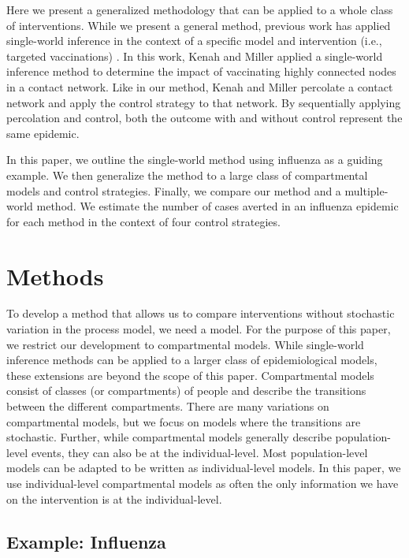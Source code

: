 \documentclass[openacc]{rsproca_new}%
\begin{document}
Here we present a generalized methodology that can be applied to a whole class of interventions.
While we present a general method, previous work has applied single-world inference in the context of a specific model and intervention (i.e., targeted vaccinations) \cite{kenah-miller:2011}.
In this work, Kenah and Miller applied a single-world inference method to determine the impact of vaccinating highly connected nodes in a contact network.
Like in our method, Kenah and Miller percolate a contact network and apply the control strategy to that network.
By sequentially applying percolation and control, both the outcome with and without control represent the same epidemic.

In this paper, we outline the single-world method using influenza as a guiding example.
We then generalize the method to a large class of compartmental models and control strategies.
Finally, we compare our method and a multiple-world method.
We estimate the number of cases averted in an influenza epidemic for each method in the context of four control strategies.

\section{Methods}

To develop a method that allows us to compare interventions without stochastic variation in the process model, we need a model.
For the purpose of this paper, we restrict our development to compartmental models.
While single-world inference methods can be applied to a larger class of epidemiological models, these extensions are beyond the scope of this paper.
Compartmental models consist of classes (or compartments) of people and describe the transitions between the different compartments.
There are many variations on compartmental models, but we focus on models where the transitions are stochastic.
Further, while compartmental models generally describe population-level events, they can also be at the individual-level.
Most population-level models can be adapted to be written as individual-level models.
In this paper, we use individual-level compartmental models as often the only information we have on the intervention is at the individual-level.

\subsection{Example: Influenza}
\end{document}
